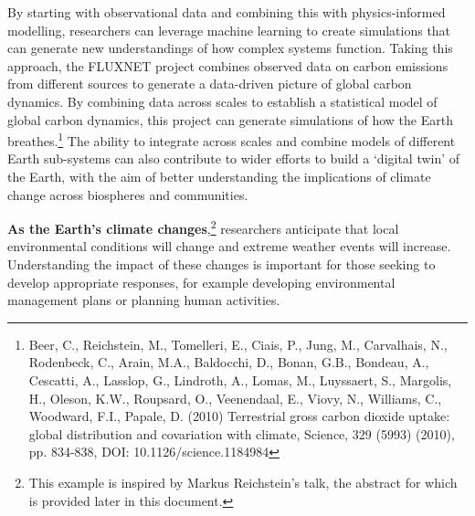 By starting with observational data and combining this with
physics-informed modelling, researchers can leverage machine learning to
create simulations that can generate new understandings of how complex
systems function. Taking this approach, the FLUXNET project combines
observed data on carbon emissions from different sources to generate a
data-driven picture of global carbon dynamics. By combining data across
scales to establish a statistical model of global carbon dynamics, this
project can generate simulations of how the Earth breathes.\footnote{Beer,
  C., Reichstein, M., Tomelleri, E., Ciais, P., Jung, M., Carvalhais,
  N., Rodenbeck, C., Arain, M.A., Baldocchi, D., Bonan, G.B., Bondeau,
  A., Cescatti, A., Lasslop, G., Lindroth, A., Lomas, M., Luyssaert, S.,
  Margolis, H., Oleson, K.W., Roupsard, O., Veenendaal, E., Viovy, N.,
  Williams, C., Woodward, F.I., Papale, D. (2010) Terrestrial gross
  carbon dioxide uptake: global distribution and covariation with
  climate, Science, 329 (5993) (2010), pp. 834-838, DOI:
  10.1126/science.1184984} The ability to integrate across scales and
combine models of different Earth sub-systems can also contribute to
wider efforts to build a `digital twin' of the Earth, with the aim of
better understanding the implications of climate change across
biospheres and communities.

\textbf{As the Earth's climate changes},\footnote{This example is
  inspired by Markus Reichstein's talk, the abstract for which is
  provided later in this document.} researchers anticipate that local
environmental conditions will change and extreme weather events will
increase. Understanding the impact of these changes is important for
those seeking to develop appropriate responses, for example developing
environmental management plans or planning human activities.

